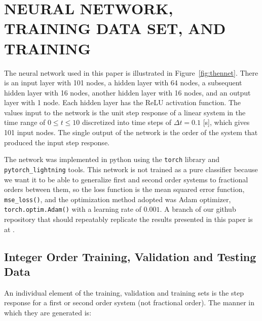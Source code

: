 \section{NEURAL NETWORK, TRAINING DATA SET, AND TRAINING}
\label{sec:network}

  The neural network used in this paper is illustrated in
  Figure~\ref{fig:thennet}. There is an input layer with 101 nodes, a hidden
  layer with 64 nodes, a subsequent hidden layer with 16 nodes, another hidden
  layer with 16 nodes, and an output layer with 1 node. Each hidden layer has
  the ReLU activation function. The values input to the network is the unit step
  response of a linear system in the time range of $0 \leq t \leq 10$
  discretized into time steps of $\Delta t = 0.1$ [s], which gives 101 input
  nodes. The single output of the network is the order of the system that
  produced the input step response. 

  The network was implemented in python using the \texttt{torch} library and
  \texttt{pytorch\_lightning} tools. This network is not trained as a pure
  classifier because we want it to be able to generalize first and second order
  systems to fractional orders between them, so the loss function is the mean
  squared error function, \texttt{mse\_loss()}, and the optimization method
  adopted was Adam optimizer, \texttt{torch.optim.Adam()} with a learning rate
  of $0.001$. A branch of our github repository that should repeatably replicate
  the results presented in this paper is at
  \cite{Goodwine_Integer_trained_neural}.

\subsection{Integer Order Training, Validation and Testing Data}

  An individual element of the training, validation and training sets is the
  step response for a first or second order system (not fractional order). The
  manner in which they are generated is:

